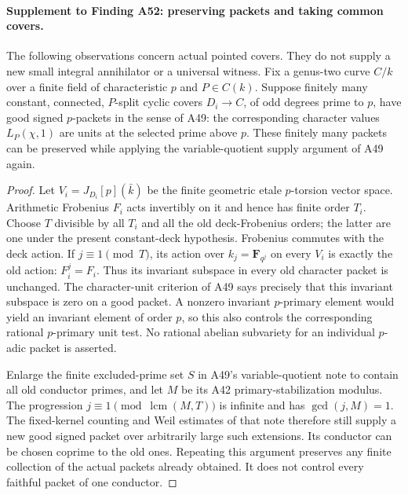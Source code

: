 \documentclass[11pt,a4paper]{article}
\begin{document}
\paragraph{Supplement to Finding A52: preserving packets and taking common covers.}
The following observations concern actual pointed covers. They do not
supply a new small integral annihilator or a universal witness.
Fix a genus-two curve $C/k$ over a finite field of characteristic $p$
and $P\in C(k)$. Suppose finitely many constant, connected,
$P$-split cyclic covers $D_i\to C$, of odd degrees prime to $p$,
have good signed $p$-packets in the sense of A49: the corresponding
character values $L_P(\chi,1)$ are units at the selected prime above $p$.
These finitely many packets can be preserved while applying the
variable-quotient supply argument of A49 again.

\begin{proof}
Let $V_i=J_{D_i}[p](\bar k)$ be the finite geometric etale
$p$-torsion vector space. Arithmetic Frobenius $F_i$ acts invertibly
on it and hence has finite order $T_i$. Choose $T$ divisible by all
$T_i$ and all the old deck-Frobenius orders; the latter are one
under the present constant-deck hypothesis. Frobenius commutes
with the deck action. If $j\equiv1\pmod T$, its action over
$k_j=\mathbf F_{q^j}$ on every $V_i$ is exactly the old action:
$F_i^j=F_i$. Thus its invariant subspace in every old character
packet is unchanged. The character-unit criterion of A49 says
precisely that this invariant subspace is zero on a good packet.
A nonzero invariant $p$-primary element would yield an invariant
element of order $p$, so this also controls the corresponding
rational $p$-primary unit test. No rational abelian subvariety
for an individual $p$-adic packet is asserted.

Enlarge the finite excluded-prime set $S$ in A49's
variable-quotient note to contain all old conductor primes, and
let $M$ be its A42 primary-stabilization modulus. The progression
$j\equiv1\pmod{\operatorname{lcm}(M,T)}$ is infinite and has
$\gcd(j,M)=1$. The fixed-kernel counting and Weil estimates of
that note therefore still supply a new good signed packet over
arbitrarily large such extensions. Its conductor can be chosen
coprime to the old ones. Repeating this argument preserves any
finite collection of the actual packets already obtained.
It does not control every faithful packet of one conductor.
\end{proof}
\end{document}
